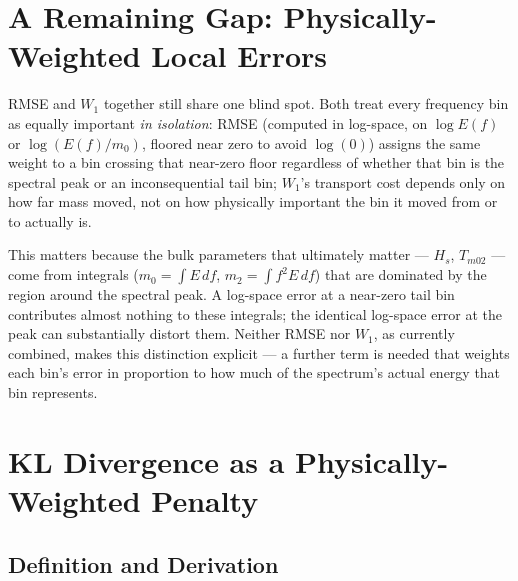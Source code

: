 \documentclass[11pt,a4paper]{article}
\begin{document}
\section{A Remaining Gap: Physically-Weighted Local Errors}
\label{sec:gap}

RMSE and $W_1$ together still share one blind spot. Both treat every
frequency bin as equally important \emph{in isolation}: RMSE (computed in
log-space, on $\log E(f)$ or $\log(E(f)/m_0)$, floored near zero to avoid
$\log(0)$) assigns the same weight to a bin crossing that near-zero floor
regardless of whether that bin is the spectral peak or an inconsequential
tail bin; $W_1$'s transport cost depends only on how far mass moved, not on
how physically important the bin it moved from or to actually is.

This matters because the bulk parameters that ultimately matter —
$H_s$, $T_{m02}$ — come from integrals ($m_0=\int E\,df$,
$m_2=\int f^2E\,df$) that are dominated by the region around the spectral
peak. A log-space error at a near-zero tail bin contributes almost nothing
to these integrals; the identical log-space error at the peak can
substantially distort them. Neither RMSE nor $W_1$, as currently combined,
makes this distinction explicit — a further term is needed that weights
each bin's error in proportion to how much of the spectrum's actual energy
that bin represents.

\section{KL Divergence as a Physically-Weighted Penalty}
\label{sec:kl}

\subsection{Definition and Derivation}
\end{document}
